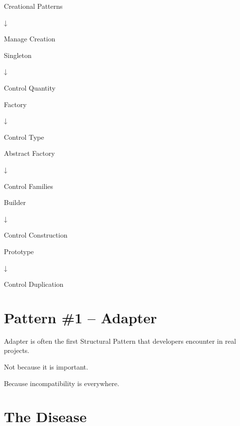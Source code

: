 \documentclass[11pt,a4paper]{book}
\begin{document}
\begin{compressionbox}

Creational Patterns

↓

Manage Creation

\vspace{0.5em}

Singleton

↓

Control Quantity

\vspace{0.5em}

Factory

↓

Control Type

\vspace{0.5em}

Abstract Factory

↓

Control Families

\vspace{0.5em}

Builder

↓

Control Construction

\vspace{0.5em}

Prototype

↓

Control Duplication

\end{compressionbox}
\section{Pattern \#1 -- Adapter}

Adapter is often the first
Structural Pattern that
developers encounter in
real projects.


Not because it is important.


Because incompatibility is
everywhere.


\section{The Disease}
\end{document}
